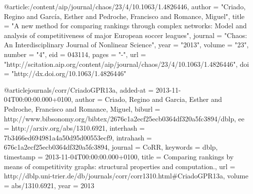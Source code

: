 @article{:/content/aip/journal/chaos/23/4/10.1063/1.4826446,
   author = "Criado, Regino and García, Esther and Pedroche, Francisco and Romance, Miguel",
   title = "A new method for comparing rankings through complex networks: Model and analysis of competitiveness of major European soccer leagues",
   journal = "Chaos: An Interdisciplinary Journal of Nonlinear Science",
   year = "2013",
   volume = "23",
   number = "4", 
   eid = 043114,
   pages = "-",
   url = "http://scitation.aip.org/content/aip/journal/chaos/23/4/10.1063/1.4826446",
   doi = "http://dx.doi.org/10.1063/1.4826446" 
}

@article{journals/corr/CriadoGPR13a,
  added-at = {2013-11-04T00:00:00.000+0100},
  author = {Criado, Regino and Garcia, Esther and Pedroche, Francisco and Romance, Miguel},
  biburl = {http://www.bibsonomy.org/bibtex/2676c1a2ecf25ecb0364df320a5fc3894/dblp},
  ee = {http://arxiv.org/abs/1310.6921},
  interhash = {7b3466ed694981a4a50d95d00553ecf9},
  intrahash = {676c1a2ecf25ecb0364df320a5fc3894},
  journal = {CoRR},
  keywords = {dblp},
  timestamp = {2013-11-04T00:00:00.000+0100},
  title = {Comparing rankings by means of competitivity graphs: structural properties and computation.},
  url = {http://dblp.uni-trier.de/db/journals/corr/corr1310.html#CriadoGPR13a},
  volume = {abs/1310.6921},
  year = 2013
}


